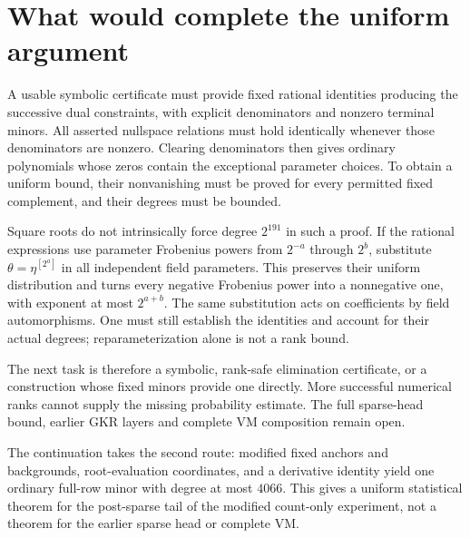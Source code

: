 \documentclass[11pt]{article}
\begin{document}
\section{What would complete the uniform argument}

A usable symbolic certificate must provide fixed rational identities producing the successive dual constraints, with explicit denominators and nonzero terminal minors. All asserted nullspace relations must hold identically whenever those denominators are nonzero. Clearing denominators then gives ordinary polynomials whose zeros contain the exceptional parameter choices. To obtain a uniform bound, their nonvanishing must be proved for every permitted fixed complement, and their degrees must be bounded.

Square roots do not intrinsically force degree $2^{191}$ in such a proof. If the rational expressions use parameter Frobenius powers from $2^{-a}$ through $2^b$, substitute $\theta=\eta^{[2^a]}$ in all independent field parameters. This preserves their uniform distribution and turns every negative Frobenius power into a nonnegative one, with exponent at most $2^{a+b}$. The same substitution acts on coefficients by field automorphisms. One must still establish the identities and account for their actual degrees; reparameterization alone is not a rank bound.

The next task is therefore a symbolic, rank-safe elimination certificate, or a construction whose fixed minors provide one directly. More successful numerical ranks cannot supply the missing probability estimate. The full sparse-head bound, earlier GKR layers and complete VM composition remain open.

The continuation  takes the second route: modified fixed anchors and backgrounds, root-evaluation coordinates, and a derivative identity yield one ordinary full-row minor with degree at most $4066$. This gives a uniform statistical theorem for the post-sparse tail of the modified count-only experiment, not a theorem for the earlier sparse head or complete VM.
\end{document}
